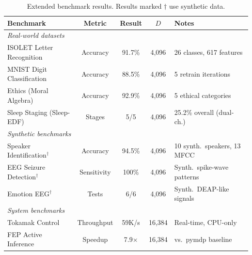 \documentclass{article}
\begin{document}
\begin{table}[h]
\centering
\caption{Extended benchmark results. Results marked $\dagger$ use synthetic data.}
\label{tab:extended}
\begin{tabular}{lcccl}
\toprule
\textbf{Benchmark} & \textbf{Metric} & \textbf{Result} & \textbf{$D$} & \textbf{Notes} \\
\midrule
\multicolumn{5}{l}{\emph{Real-world datasets}} \\
ISOLET Letter Recognition & Accuracy & 91.7\% & 4,096 & 26 classes, 617 features \\
MNIST Digit Classification & Accuracy & 88.5\% & 4,096 & 5 retrain iterations \\
Ethics (Moral Algebra) & Accuracy & 92.9\% & 4,096 & 5 ethical categories \\
Sleep Staging (Sleep-EDF) & Stages & 5/5 & 4,096 & 25.2\% overall (dual-ch.) \\
\midrule
\multicolumn{5}{l}{\emph{Synthetic benchmarks}} \\
Speaker Identification$^\dagger$ & Accuracy & 94.5\% & 4,096 & 10 synth.\ speakers, 13 MFCC \\
EEG Seizure Detection$^\dagger$ & Sensitivity & 100\% & 4,096 & Synth.\ spike-wave patterns \\
Emotion EEG$^\dagger$ & Tests & 6/6 & 4,096 & Synth.\ DEAP-like signals \\
\midrule
\multicolumn{5}{l}{\emph{System benchmarks}} \\
Tokamak Control & Throughput & 59K/s & 16,384 & Real-time, CPU-only \\
FEP Active Inference & Speedup & 7.9$\times$ & 16,384 & vs.\ pymdp baseline \\
\bottomrule
\end{tabular}
\end{table}
\end{document}
